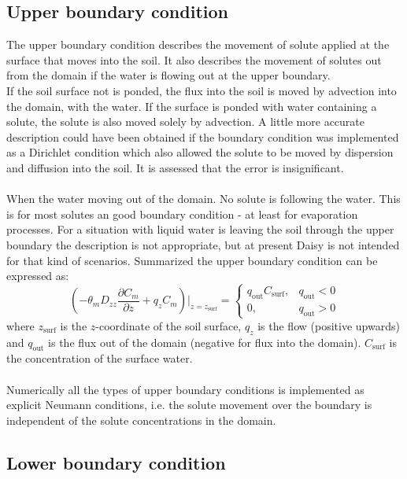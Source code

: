 \documentclass{report}
\begin{document}
\subsection{Upper boundary condition}


The upper boundary condition describes the movement of solute
applied at the surface that moves into the soil. It also describes the
movement of solutes out from the domain if the water is flowing
out at the upper boundary.\\

If the soil surface not is ponded, the flux into the soil is moved by
advection into the domain, with the water. If the surface is ponded
with water containing a solute, the solute is also moved solely by
advection. A little more accurate description could have been
obtained if the boundary condition was implemented as a Dirichlet
condition which also allowed the solute to be moved by dispersion
and diffusion into the soil. It is assessed that the error is
insignificant.\\
\\
When the water moving out of the domain. No solute is following
the water. This is for most solutes an good boundary condition - at
least for evaporation processes. For a situation with liquid water is
leaving the soil through the upper boundary the description is not
appropriate, but at present Daisy is not intended for that kind of
scenarios. Summarized the upper boundary condition can be
expressed as:
%
\begin{equation}
\left(-\theta_m D_{zz} \frac{\partial C_m}{\partial z}+q_zC_m \right) \bigg \vert_{z=z_{\text{surf}}}
=\begin{cases} q_{\text{out}}C_{\text{surf}}, &
  q_{\text{out}} < 0  \\ 0, & q_{\text{out}} > 0 \end{cases}
\end{equation}
%
where $z_{\text{surf}}$ is the $z$-coordinate of the soil surface,
$q_z$ is the flow (positive upwards) and $q_{\text{out}}$ is the
flux out of the domain (negative for flux into the domain).
$C_{\text{surf}}$ is the concentration of the surface water. \\
\\
Numerically all the types of upper boundary conditions is
implemented as explicit Neumann conditions, i.e. the solute
movement over the boundary is independent of the solute
concentrations in the domain.



\subsection{Lower boundary condition}
\end{document}
